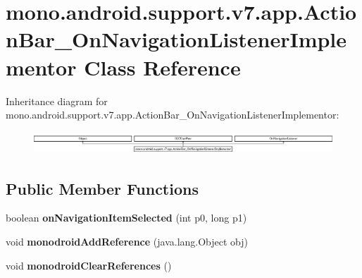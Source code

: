 \hypertarget{classmono_1_1android_1_1support_1_1v7_1_1app_1_1_action_bar___on_navigation_listener_implementor}{}\section{mono.\+android.\+support.\+v7.\+app.\+Action\+Bar\+\_\+\+On\+Navigation\+Listener\+Implementor Class Reference}
\label{classmono_1_1android_1_1support_1_1v7_1_1app_1_1_action_bar___on_navigation_listener_implementor}
Inheritance diagram for mono.\+android.\+support.\+v7.\+app.\+Action\+Bar\+\_\+\+On\+Navigation\+Listener\+Implementor\+:\begin{figure}[H]
\begin{center}
\leavevmode
\includegraphics[height=0.844646cm]{classmono_1_1android_1_1support_1_1v7_1_1app_1_1_action_bar___on_navigation_listener_implementor}
\end{center}
\end{figure}
\subsection*{Public Member Functions}
\begin{DoxyCompactItemize}
\item 
\mbox{\label{classmono_1_1android_1_1support_1_1v7_1_1app_1_1_action_bar___on_navigation_listener_implementor_aa8e79b4e1839807bbcb095ce88841c8d}} 
boolean {\bfseries on\+Navigation\+Item\+Selected} (int p0, long p1)
\item 
\mbox{\label{classmono_1_1android_1_1support_1_1v7_1_1app_1_1_action_bar___on_navigation_listener_implementor_ab81ccc974aea244bca8ff1bd961c7f3d}} 
void {\bfseries monodroid\+Add\+Reference} (java.\+lang.\+Object obj)
\item 
\mbox{\label{classmono_1_1android_1_1support_1_1v7_1_1app_1_1_action_bar___on_navigation_listener_implementor_a36832b5ba4a1ccf95e0e38fe4cab8587}} 
void {\bfseries monodroid\+Clear\+References} ()
\end{DoxyCompactItemize}
